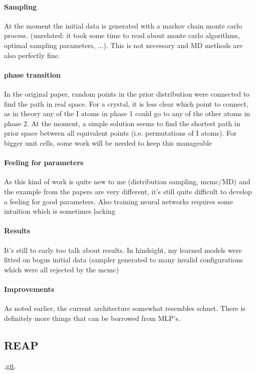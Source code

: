 \documentclass{article}
\begin{document}
\paragraph{Sampling} At the moment the initial data is generated with a markov chain monte carlo process. (unrelated: it took some time to read about monte carlo algorithms, optimal sampling parameters, ...). This is not necessary and MD methods are also perfectly fine.

\paragraph{phase transition} In the original paper, random points in the prior distribution were connected to find the path in real space. For a  crystal, it is less clear which point to connect, as in theory any of the I atoms in phase 1 could go to any of the other atoms in phase 2. At the moment, a simple solution seems to find the shortest path in prior space between all equivalent points (i.e. permutations of I atoms). For bigger unit cells, some work will be needed to keep this manageable

\paragraph{Feeling for parameters} As this kind of work is quite new to me (distribution sampling, mcmc/MD) and the example from the papers are very different, it's still quite difficult to develop a feeling for good parameters. Also training neural networks requires some intuition which is sometimes lacking

\paragraph{Results} It's still to early too talk about results. In hindsight, my learned models were fitted on bogus initial data (sampler generated to many invalid configurations which were all rejected by the mcmc)

\paragraph{Improvements} As noted earlier, the current architecture somewhat resembles schnet. There is definitely more things that can be borrowed from MLP's.

\subsection{REAP} \cite{Shamsi2018},\href{https://github.com/ShuklaGroup/REAP-ReinforcementLearningBasedAdaptiveSampling}{git}.
\end{document}
